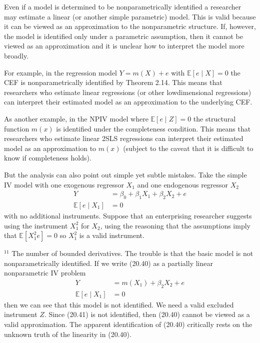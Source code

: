 \documentclass[10pt]{article}
\begin{document}
Even if a model is determined to be nonparametrically identified a researcher may estimate a linear (or another simple parametric) model. This is valid because it can be viewed as an approximation to the nonparametric structure. If, however, the model is identified only under a parametric assumption, then it cannot be viewed as an approximation and it is unclear how to interpret the model more broadly.

For example, in the regression model $Y=m(X)+e$ with $\mathbb{E}[e \mid X]=0$ the CEF is nonparametrically identified by Theorem 2.14. This means that researchers who estimate linear regressions (or other lowdimensional regressions) can interpret their estimated model as an approximation to the underlying CEF.

As another example, in the NPIV model where $\mathbb{E}[e \mid Z]=0$ the structural function $m(x)$ is identified under the completeness condition. This means that researchers who estimate linear 2SLS regressions can interpret their estimated model as an approximation to $m(x)$ (subject to the caveat that it is difficult to know if completeness holds).

But the analysis can also point out simple yet subtle mistakes. Take the simple IV model with one exogenous regressor $X_{1}$ and one endogenous regressor $X_{2}$
$$
\begin{aligned}
Y &=\beta_{0}+\beta_{1} X_{1}+\beta_{2} X_{2}+e \\
\mathbb{E}\left[e \mid X_{1}\right] &=0
\end{aligned}
$$
with no additional instruments. Suppose that an enterprising researcher suggests using the instrument $X_{1}^{2}$ for $X_{2}$, using the reasoning that the assumptions imply that $\mathbb{E}\left[X_{1}^{2} e\right]=0$ so $X_{1}^{2}$ is a valid instrument.

${ }^{11}$ The number of bounded derivatives. The trouble is that the basic model is not nonparametrically identified. If we write (20.40) as a partially linear nonparametric IV problem
$$
\begin{aligned}
Y &=m\left(X_{1}\right)+\beta_{2} X_{2}+e \\
\mathbb{E}\left[e \mid X_{1}\right] &=0
\end{aligned}
$$
then we can see that this model is not identified. We need a valid excluded instrument $Z$. Since (20.41) is not identified, then (20.40) cannot be viewed as a valid approximation. The apparent identification of (20.40) critically rests on the unknown truth of the linearity in (20.40).
\end{document}
